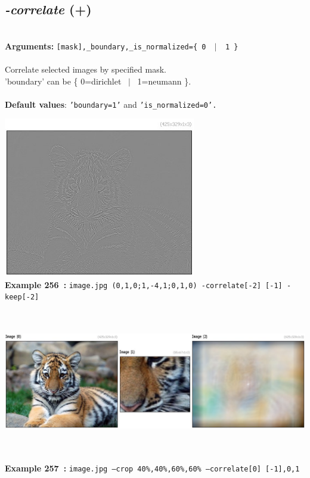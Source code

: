 \documentclass[a4paper,11pt,twoside]{book}
\begin{document}
\subsection{\emph{-correlate} (+)}\vspace*{-0.5em}
~\\\textbf{Arguments: } 
{\small \texttt{[mask],\_boundary,\_is\_normalized=\{ 0 ~$|$~ 1 \}}}\\~\\
Correlate selected images by specified mask.
~\\'boundary' can be \{ 0=dirichlet ~$|$~ 1=neumann \}.
~\\~\\\textbf{Default values}: {\small \texttt{'boundary=1'} and \texttt{'is\_normalized=0'.}}
\begin{center}\includegraphics[keepaspectratio=true,height=7cm,width=\textwidth]{img/gmic_def256.jpg}\\
{\footnotesize \textbf{Example 256~:} \texttt{image.jpg (0,1,0;1,-4,1;0,1,0) -correlate[-2] [-1] -keep[-2]}}
\\\includegraphics[keepaspectratio=true,height=7cm,width=\textwidth]{img/gmic_def257.jpg}\\
{\footnotesize \textbf{Example 257~:} \texttt{image.jpg --crop 40\%,40\%,60\%,60\% --correlate[0] [-1],0,1}}
\end{center}
\end{document}
